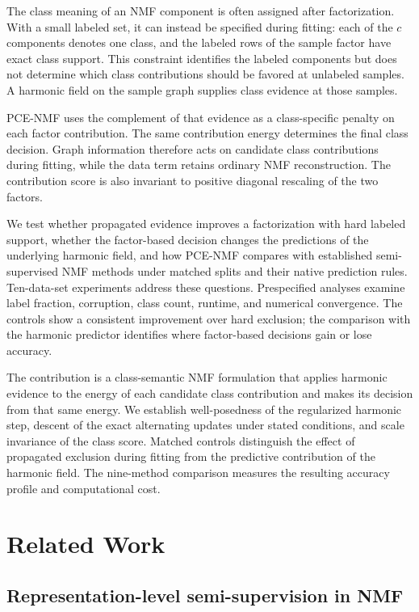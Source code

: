 \documentclass[preprint,12pt]{elsarticle}
\theoremstyle{remark}
\begin{document}
The class meaning of an NMF component is often assigned after
factorization. With a small labeled set, it can instead be specified
during fitting: each of the $c$ components denotes one class, and the
labeled rows of the sample factor have exact class support. This
constraint identifies the labeled components but does not determine
which class contributions should be favored at unlabeled samples. A
harmonic field on the sample graph supplies class evidence at those
samples.

PCE-NMF uses the complement of that evidence as a class-specific
penalty on each factor contribution. The same contribution energy
determines the final class decision. Graph information therefore acts
on candidate class contributions during fitting, while the data term
retains ordinary NMF reconstruction. The contribution score is also
invariant to positive diagonal rescaling of the two factors.

We test whether propagated evidence improves a factorization with
hard labeled support, whether the factor-based decision changes the
predictions of the underlying harmonic field, and how PCE-NMF compares
with established semi-supervised NMF methods under matched splits and
their native prediction rules. Ten-data-set experiments address these
questions. Prespecified analyses examine label fraction, corruption,
class count, runtime, and numerical convergence. The controls show a
consistent improvement over hard exclusion; the comparison with the
harmonic predictor identifies where factor-based decisions gain or
lose accuracy.

The contribution is a class-semantic NMF formulation that applies
harmonic evidence to the energy of each candidate class contribution
and makes its decision from that same energy. We establish
well-posedness of the regularized harmonic step, descent of the exact
alternating updates under stated conditions, and scale invariance of
the class score. Matched controls distinguish the effect of propagated
exclusion during fitting from the predictive contribution of the
harmonic field. The nine-method comparison measures the resulting
accuracy profile and computational cost.

\section{Related Work}
\label{sec:related}

\subsection{Representation-level semi-supervision in NMF}
\end{document}
